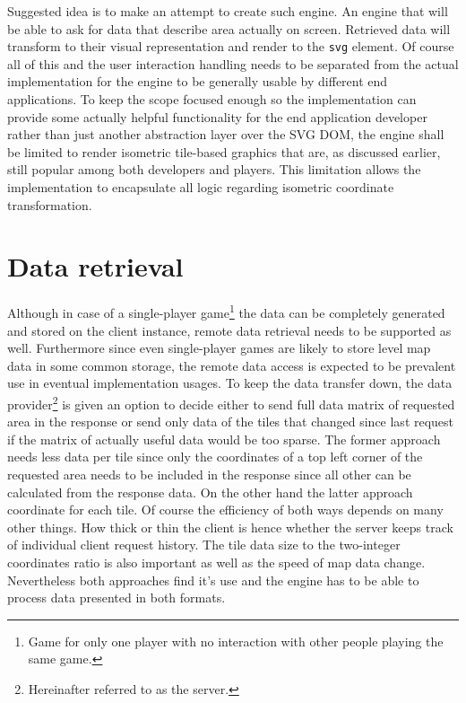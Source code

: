 \documentclass[11pt,oneside, final]{fithesis2}
\begin{document}
Suggested idea is to make an attempt to create such engine. An engine that will be able to ask for data that describe area actually on screen. Retrieved data will transform to their visual representation and render to the \texttt{svg} element. Of course all of this and the user interaction handling needs to be separated from the actual implementation for the engine to be generally usable by different end applications. To keep the scope focused enough so the implementation can provide some actually helpful functionality for the end application developer rather than just another abstraction layer over the SVG DOM, the engine shall be limited to render isometric tile-based graphics that are, as discussed earlier, still popular among both developers and players. This limitation allows the implementation to encapsulate all logic regarding isometric coordinate transformation.

\section{Data retrieval}
Although in case of a single-player game\footnote{Game for only one player with no interaction with other people playing the same game.} the data can be completely generated and stored on the client instance, remote data retrieval needs to be supported as well. Furthermore since even single-player games are likely to store level map data in some common storage, the remote data access is expected to be prevalent use in eventual implementation usages. To keep the data transfer down, the data provider\footnote{Hereinafter referred to as the server.} is given an option to decide either to send full data matrix of requested area in the response or send only data of the tiles that changed since last request if the matrix of actually useful data would be too sparse. The former approach needs less data per tile since only the coordinates of a top left corner of the requested area needs to be included in the response since all other can be calculated from the response data. On the other hand the latter approach coordinate for each tile. Of course the efficiency of both ways depends on many other things. How thick or thin the client is hence whether the server keeps track of individual client request history. The tile data size to the two-integer coordinates ratio is also important as well as the speed of map data change. Nevertheless both approaches find it's use and the engine has to be able to process data presented in both formats.
\end{document}
